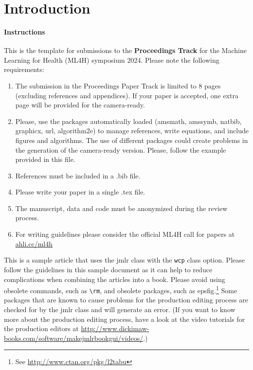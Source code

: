 \documentclass[pmlr,twocolumn,10pt]{jmlr} %
\begin{document}
\section{Introduction}
\label{sec:intro}

\paragraph{Instructions} This is the template for submissions to the \textbf{Proceedings Track} for the Machine Learning for Health (ML4H) symposium 2024. Please note the following requirements:

\begin{enumerate}
    \item The submission in the Proceedings Paper Track is limited to 8 pages (excluding references and appendices). If your paper is accepted, one extra page will be provided for the camera-ready.
    \item Please, use the packages automatically loaded (amsmath, amssymb, natbib, graphicx, url, algorithm2e) to manage references, write equations, and include figures and algorithms. The use of different packages could create problems in the generation of the camera-ready version. Please, follow the example provided in this file.
    \item References must be included in a .bib file.
    \item Please write your paper in a single .tex file.
    \item The manuscript, data and code must be anonymized during the review process.
    \item For writing guidelines please consider the official ML4H call for papers at \url{ahli.cc/ml4h}
\end{enumerate}

\newpage


This is a sample article that uses the \textsf{jmlr} class with
the \texttt{wcp} class option.  Please follow the guidelines in
this sample document as it can help to reduce complications when
combining the articles into a book. Please avoid using obsolete
commands, such as \verb|\rm|, and obsolete packages, such as
\textsf{epsfig}.\footnote{See
\url{http://www.ctan.org/pkg/l2tabu}} Some packages that are known
to cause problems for the production editing process are checked for
by the \textsf{jmlr} class and will generate an error. (If you want
to know more about the production editing process, have a look at
the video tutorials for the production editors at
\url{http://www.dickimaw-books.com/software/makejmlrbookgui/videos/}.)
\end{document}
